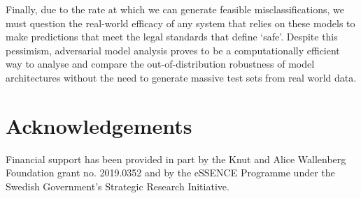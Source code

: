 \documentclass[journal]{IEEEtran}
\begin{document}
Finally, due to the rate at which we can generate feasible misclassifications, we must question the real-world efficacy of any system that relies on these models to make predictions that meet the legal standards that define `safe'.
Despite this pessimism, adversarial model analysis proves to be a computationally efficient way to analyse and compare the out-of-distribution robustness of model architectures without the need to generate massive test sets from real world data.

\section{Acknowledgements}
Financial support has been provided in part by the Knut and Alice Wallenberg Foundation grant no. 2019.0352 and by the eSSENCE Programme under the Swedish Government’s Strategic Research Initiative.

\FloatBarrier



\end{document}

